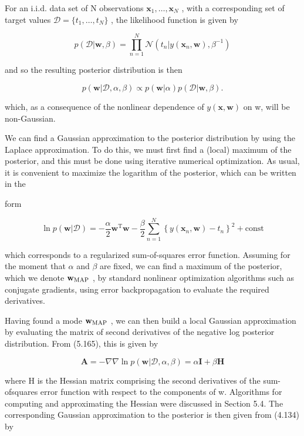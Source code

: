 \documentclass[
  10
]{article}
\begin{document}
For an i.i.d. data set of N observations
\(\mathbf { x } _ { 1 } , \ldots , \mathbf { x } _ { N }\) , with a
corresponding set of target values
\(\mathcal { D } = \{ t _ { 1 } , \ldots , t _ { N } \}\) , the
likelihood function is given by

\[
p (\mathcal {D} | \mathbf {w}, \beta) = \prod_ {n = 1} ^ {N} \mathcal {N} (t _ {n} | y (\mathbf {x} _ {n}, \mathbf {w}), \beta^ {- 1})\tag{5.163}
\]

and so the resulting posterior distribution is then

\[
p (\mathbf {w} | \mathcal {D}, \alpha , \beta) \propto p (\mathbf {w} | \alpha) p (\mathcal {D} | \mathbf {w}, \beta).\tag{5.164}
\]

which, as a consequence of the nonlinear dependence of
\(y ( \mathbf { x } , \mathbf { w } )\) on w, will be non-Gaussian.

We can find a Gaussian approximation to the posterior distribution by
using the Laplace approximation. To do this, we must first find a
(local) maximum of the posterior, and this must be done using iterative
numerical optimization. As usual, it is convenient to maximize the
logarithm of the posterior, which can be written in the

form

\[
\ln p (\mathbf {w} | \mathcal {D}) = - \frac {\alpha}{2} \mathbf {w} ^ {\mathrm{T}} \mathbf {w} - \frac {\beta}{2} \sum_ {n = 1} ^ {N} \left\{y (\mathbf {x} _ {n}, \mathbf {w}) - t _ {n} \right\} ^ {2} + \mathrm{const}\tag{5.165}
\]

which corresponds to a regularized sum-of-squares error function.
Assuming for the moment that \(\alpha\) and \(\beta\) are fixed, we can
find a maximum of the posterior, which we denote
\({ \bf w } _ { \mathrm { M A P } }\) , by standard nonlinear
optimization algorithms such as conjugate gradients, using error
backpropagation to evaluate the required derivatives.

Having found a mode \({ \bf w } _ { \mathrm { M A P } }\) , we can then
build a local Gaussian approximation by evaluating the matrix of second
derivatives of the negative log posterior distribution. From (5.165),
this is given by

\[
\mathbf {A} = - \nabla \nabla \ln p (\mathbf {w} | \mathcal {D}, \alpha , \beta) = \alpha \mathbf {I} + \beta \mathbf {H}\tag{5.166}
\]

where H is the Hessian matrix comprising the second derivatives of the
sum-ofsquares error function with respect to the components of w.
Algorithms for computing and approximating the Hessian were discussed in
Section 5.4. The corresponding Gaussian approximation to the posterior
is then given from (4.134) by
\end{document}
